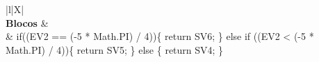 \begin{xltabular}{\textwidth}{|l|X|}
		 \\ \hline
		\textbf{Blocos} &  \\ \hline
		 & if((EV2 == (-5 * Math.PI) / 4))\{   return SV6; \} else if ((EV2 < (-5 * Math.PI) / 4))\{   return SV5; \} else \{   return SV4; \} \\ \hline


\end{xltabular}
